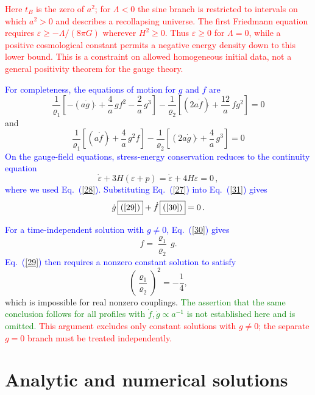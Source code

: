 \documentclass [prd,reprint,eqsecnum,nofootinbib]  {revtex4-1}
\newcommand{\lang}[1]{\textcolor{blue}{#1}}
\newcommand{\science}[1]{\textcolor{red}{#1}}
\newcommand{\remove}[1]{\textcolor{green}{#1}}
\begin{document}
\science{Here $t_B$ is the zero of $a^2$; for $\Lambda<0$ the sine
branch is restricted to intervals on which $a^2>0$ and describes a
recollapsing universe. The first Friedmann equation requires
$\varepsilon\geq-\Lambda/(8\pi G)$ wherever $H^2\geq0$. Thus
$\varepsilon\geq0$ for $\Lambda=0$, while a positive cosmological
constant permits a negative energy density down to this lower bound.
This is a constraint on allowed homogeneous initial data, not a
general positivity theorem for the gauge theory.}

\lang{For completeness, the equations of motion for $g$ and $f$ are}
\begin{equation}
\frac1{\varrho_1}\left[ -(a\dot g)\dot{} + \frac{4}a\, gf^2 -
\frac{2}a\, g^3\right] -\frac1{\varrho_2}\left[ (2a\dot f)\dot{} +
\frac{12}a\, fg^2 \right]=0\label{29}
\end{equation}
and
\begin{equation}
\frac1{\varrho_1}\left[ (a\dot f)\dot{} + \frac{4}a\, g^2f \right]
-\frac1{\varrho_2}\left[ (2a\dot g)\dot{} + \frac{4}a\, g^3
\right]=0\label{30}
\end{equation}
\lang{On the gauge-field equations, stress-energy conservation
reduces to the continuity equation}
\begin{equation}\label{31}
\dot \varepsilon +3H(\varepsilon+p)= \dot \varepsilon
+4H\varepsilon=0\,,
\end{equation}
\lang{where we used Eq.~(\ref{28}). Substituting Eq.~(\ref{27}) into
Eq.~(\ref{31}) gives}
\begin{equation}\label{32}
    \dot g\, \mbox{\framebox{(\ref{29})}} +\dot f\, \mbox{\framebox{(\ref{30})}}=0\,.
\end{equation}



\lang{For a time-independent solution with $g\ne0$, Eq.~(\ref{30}) gives}
\[
f=\frac{\varrho_1}{\varrho_2}\,g.
\]
\lang{Eq.~(\ref{29}) then requires a nonzero constant solution to satisfy}
\[
\left(\frac{\varrho_1}{\varrho_2}\right)^2=-\frac1{4},
\]
which is impossible for real nonzero couplings. \remove{The assertion
that the same conclusion follows for all profiles with
$\dot f,\dot g\propto a^{-1}$ is not established here and is omitted.}
\science{This argument excludes only constant solutions with
$g\ne0$; the separate $g=0$ branch must be treated independently.}

\section{Analytic and numerical solutions}
\end{document}
